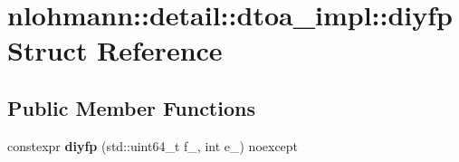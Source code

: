 \hypertarget{structnlohmann_1_1detail_1_1dtoa__impl_1_1diyfp}{}\section{nlohmann\+:\+:detail\+:\+:dtoa\+\_\+impl\+:\+:diyfp Struct Reference}
\label{structnlohmann_1_1detail_1_1dtoa__impl_1_1diyfp}
\subsection*{Public Member Functions}
\begin{DoxyCompactItemize}
\item 
\mbox{\label{structnlohmann_1_1detail_1_1dtoa__impl_1_1diyfp_ad8798a8823a49c8412f0fada9892c918}} 
constexpr {\bfseries diyfp} (std\+::uint64\+\_\+t f\+\_\+, int e\+\_\+) noexcept
\end{DoxyCompactItemize}
